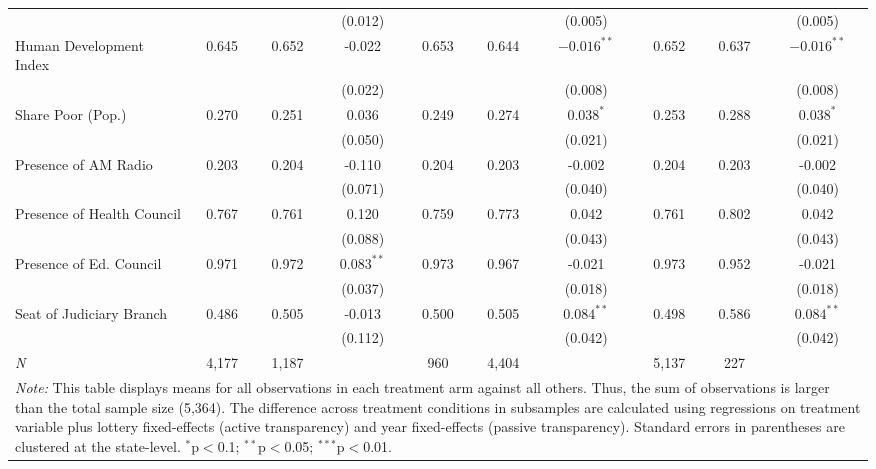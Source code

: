 \begin{table}[!htbp]
\begin{tabular}{@{\extracolsep{-4pt}}l@{\extracolsep{-3pt}}ccccccccc}
                                      &       &       & (0.012)      &       &       & (0.005)         &      &       & (0.005)       \\
Human Development Index \vspace{1pt}  & 0.645 & 0.652 & -0.022       & 0.653 & 0.644 & $-0.016^{**}$   & 0.652& 0.637 & $-0.016^{**}$ \\
                                      &       &       & (0.022)      &       &       & (0.008)         &      &       & (0.008)       \\
Share Poor (Pop.)                     & 0.270 & 0.251 & 0.036        & 0.249 & 0.274 & $0.038^{*}$     & 0.253& 0.288 & $0.038^{*}$   \\
                                      &       &       & (0.050)      &       &       & (0.021)         &      &       & (0.021)       \\
Presence of AM Radio                  & 0.203 & 0.204 & -0.110       & 0.204 & 0.203 & -0.002          & 0.204& 0.203 & -0.002        \\
                                      &       &       & (0.071)      &       &       & (0.040)         &      &       & (0.040)       \\
Presence of Health Council            & 0.767 & 0.761 & 0.120        & 0.759 & 0.773 & 0.042           & 0.761& 0.802 & 0.042         \\
                                      &       &       & (0.088)      &       &       & (0.043)         &      &       & (0.043)       \\
Presence of Ed. Council               & 0.971 & 0.972 &$0.083^{**}$  & 0.973 & 0.967 & -0.021          & 0.973& 0.952 & -0.021        \\
                                      &       &       & (0.037)      &       &       & (0.018)         &      &       & (0.018)       \\
Seat of Judiciary Branch              & 0.486 & 0.505 & -0.013       & 0.500 & 0.505 & $0.084^{**}$    & 0.498& 0.586 & $0.084^{**}$  \\
                                      &       &       & (0.112)      &       &       & (0.042)         &      &       & (0.042) \B    \\
\hline
\emph{N} & 4,177 & 1,187 & & 960 & 4,404 & & 5,137 & 227 & \T  \B \\
\hline
\hline
\multicolumn{10}{p{\textwidth}}{\emph{Note:} This table displays means for all observations in each treatment arm against all others. Thus, the sum of observations is larger than the total sample size (5,364). The difference across treatment conditions in subsamples are calculated using regressions on treatment variable plus lottery fixed-effects (active transparency) and year fixed-effects (passive transparency). Standard errors in parentheses are clustered at the state-level. $^{*}$p$<$0.1; $^{**}$p$<$0.05; $^{***}$p$<$0.01.}
\end{tabular}
\end{table}



